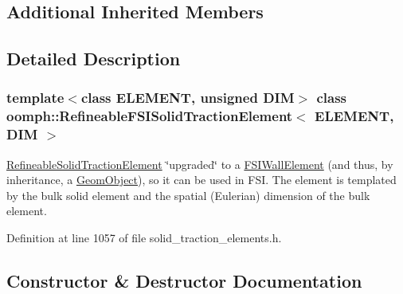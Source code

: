 \subsection*{Additional Inherited Members}


\subsection{Detailed Description}
\subsubsection*{template$<$class E\+L\+E\+M\+E\+NT, unsigned D\+IM$>$\newline
class oomph\+::\+Refineable\+F\+S\+I\+Solid\+Traction\+Element$<$ E\+L\+E\+M\+E\+N\+T, D\+I\+M $>$}

\hyperlink{classoomph_1_1RefineableSolidTractionElement}{Refineable\+Solid\+Traction\+Element} \char`\"{}upgraded\char`\"{} to a \hyperlink{classoomph_1_1FSIWallElement}{F\+S\+I\+Wall\+Element} (and thus, by inheritance, a \hyperlink{classoomph_1_1GeomObject}{Geom\+Object}), so it can be used in F\+SI. The element is templated by the bulk solid element and the spatial (Eulerian) dimension of the bulk element. 

Definition at line 1057 of file solid\+\_\+traction\+\_\+elements.\+h.



\subsection{Constructor \& Destructor Documentation}
\mbox{\label{classoomph_1_1RefineableFSISolidTractionElement_aa3b729e477187807b8ade53d64200e22}} 
